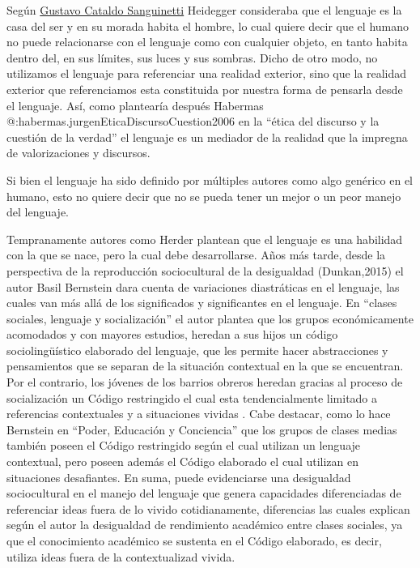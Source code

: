 \documentclass[
]{article}
\begin{document}
Según
\href{https://scielo.conicyt.cl/scielo.php?script=sci_arttext\&pid=S0718-43602006000100004\#:~:text=Heidegger\%20no\%20solo\%20afirma\%20que,morada\%20habita\%20el\%20hombre\%222.\&text=El\%20lenguaje\%2C\%20al\%20mismo\%20tiempo,y\%20la\%20casa\%20del\%20hombre}{Gustavo
Cataldo Sanguinetti} Heidegger consideraba que el lenguaje es la casa
del ser y en su morada habita el hombre, lo cual quiere decir que el
humano no puede relacionarse con el lenguaje como con cualquier objeto,
en tanto habita dentro del, en sus límites, sus luces y sus sombras.
Dicho de otro modo, no utilizamos el lenguaje para referenciar una
realidad exterior, sino que la realidad exterior que referenciamos esta
constituida por nuestra forma de pensarla desde el lenguaje. Así, como
plantearía después Habermas @:habermas.jurgenEticaDiscursoCuestion2006
en la ``ética del discurso y la cuestión de la verdad'' el lenguaje es
un mediador de la realidad que la impregna de valorizaciones y
discursos.

Si bien el lenguaje ha sido definido por múltiples autores como algo
genérico en el humano, esto no quiere decir que no se pueda tener un
mejor o un peor manejo del lenguaje.

Tempranamente autores como Herder plantean que el lenguaje es una
habilidad con la que se nace, pero la cual debe desarrollarse. Años más
tarde, desde la perspectiva de la reproducción sociocultural de la
desigualdad (Dunkan,2015) el autor Basil Bernstein dara cuenta de
variaciones diastráticas en el lenguaje, las cuales van más allá de los
significados y significantes en el lenguaje. En ``clases sociales,
lenguaje y socialización'' el autor plantea que los grupos
económicamente acomodados y con mayores estudios, heredan a sus hijos un
código sociolingüístico elaborado del lenguaje, que les permite hacer
abstracciones y pensamientos que se separan de la situación contextual
en la que se encuentran. Por el contrario, los jóvenes de los barrios
obreros heredan gracias al proceso de socialización un Código
restringido el cual esta tendencialmente limitado a referencias
contextuales y a situaciones vividas . Cabe destacar, como lo hace
Bernstein en ``Poder, Educación y Conciencia'' que los grupos de clases
medias también poseen el Código restringido según el cual utilizan un
lenguaje contextual, pero poseen además el Código elaborado el cual
utilizan en situaciones desafiantes. En suma, puede evidenciarse una
desigualdad sociocultural en el manejo del lenguaje que genera
capacidades diferenciadas de referenciar ideas fuera de lo vivido
cotidianamente, diferencias las cuales explican según el autor la
desigualdad de rendimiento académico entre clases sociales, ya que el
conocimiento académico se sustenta en el Código elaborado, es decir,
utiliza ideas fuera de la contextualizad vivida.
\end{document}
